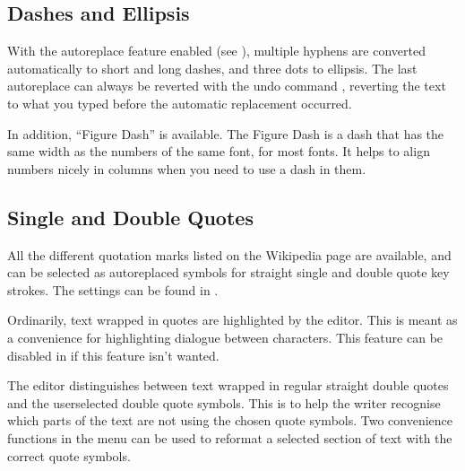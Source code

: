 \documentclass[a4paper,11pt,english]{sphinxmanual}
\begin{document}
\subsection{Dashes and Ellipsis}
\label{\detokenize{usage_typography:dashes-and-ellipsis}}
\sphinxAtStartPar
With the auto\sphinxhyphen{}replace feature enabled (see {\hyperref[\detokenize{usage_writing:a-ui-edit-auto}]{}}), multiple hyphens are converted
automatically to short and long dashes, and three dots to ellipsis. The last auto\sphinxhyphen{}replace can
always be reverted with the undo command , reverting the text to what you typed before
the automatic replacement occurred.

\sphinxAtStartPar
In addition, “Figure Dash” is available. The Figure Dash is a dash that has the same width as the
numbers of the same font, for most fonts. It helps to align numbers nicely in columns when you need
to use a dash in them.


\subsection{Single and Double Quotes}
\label{\detokenize{usage_typography:single-and-double-quotes}}
\sphinxAtStartPar
All the different quotation marks listed on the  Wikipedia page are available, and
can be selected as auto\sphinxhyphen{}replaced symbols for straight single and double quote key strokes. The
settings can be found in .

\sphinxAtStartPar
Ordinarily, text wrapped in quotes are highlighted by the editor. This is meant as a convenience
for highlighting dialogue between characters. This feature can be disabled in
 if this feature isn’t wanted.

\sphinxAtStartPar
The editor distinguishes between text wrapped in regular straight double quotes and the
user\sphinxhyphen{}selected double quote symbols. This is to help the writer recognise which parts of the text
are not using the chosen quote symbols. Two convenience functions in the  menu
can be used to re\sphinxhyphen{}format a selected section of text with the correct quote symbols.
\end{document}
